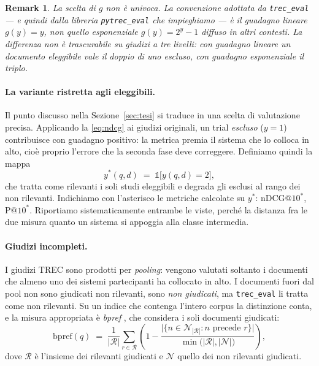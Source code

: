 \documentclass[pdflatex,sn-mathphys-num]{sn-jnl}
\theoremstyle{thmstyleone}
\theoremstyle{thmstyletwo}
\newtheorem{remark}{Remark}
\theoremstyle{thmstylethree}
\begin{document}
\begin{remark}
La scelta di $g$ non è univoca. La convenzione adottata da \texttt{trec\_eval} --- e quindi dalla libreria \texttt{pytrec\_eval} \cite{vangysel2018pytreceval} che impieghiamo --- è il guadagno \emph{lineare} $g(y) = y$, non quello esponenziale $g(y) = 2^{y}-1$ diffuso in altri contesti. La differenza non è trascurabile su giudizi a tre livelli: con guadagno lineare un documento eleggibile vale il doppio di uno escluso, con guadagno esponenziale il triplo.
\end{remark}

\paragraph{La variante ristretta agli eleggibili.} Il punto discusso nella Sezione~\ref{sec:tesi} si traduce in una scelta di valutazione precisa. Applicando la \eqref{eq:ndcg} ai giudizi originali, un trial \emph{escluso} ($y=1$) contribuisce con guadagno positivo: la metrica premia il sistema che lo colloca in alto, cioè proprio l'errore che la seconda fase deve correggere. Definiamo quindi la mappa
\begin{equation}
  y^{*}(q,d) \;=\; \mathds{1}\big[y(q,d) = 2\big],
  \label{eq:binaria}
\end{equation}
che tratta come rilevanti i soli studi eleggibili e degrada gli esclusi al rango dei non rilevanti. Indichiamo con l'asterisco le metriche calcolate su $y^{*}$: $\mathrm{nDCG@}10^{*}$, $\mathrm{P@}10^{*}$. Riportiamo sistematicamente entrambe le viste, perché la distanza fra le due misura quanto un sistema si appoggia alla classe intermedia.

\paragraph{Giudizi incompleti.} I giudizi TREC sono prodotti per \emph{pooling}: vengono valutati soltanto i documenti che almeno uno dei sistemi partecipanti ha collocato in alto. I documenti fuori dal pool non sono giudicati non rilevanti, sono \emph{non giudicati}, ma \texttt{trec\_eval} li tratta come non rilevanti. Su un indice che contenga l'intero corpus la distinzione conta, e la misura appropriata è \emph{bpref} \cite{buckley2004bpref}, che considera i soli documenti giudicati:
\begin{equation}
  \mathrm{bpref}(q) \;=\; \frac{1}{|\mathcal{R}|}\sum_{r \in \mathcal{R}} \left(1 - \frac{\big|\{n \in \mathcal{N}_{|\mathcal{R}|} : n \text{ precede } r\}\big|}{\min\big(|\mathcal{R}|, |\mathcal{N}|\big)}\right),
  \label{eq:bpref}
\end{equation}
dove $\mathcal{R}$ è l'insieme dei rilevanti giudicati e $\mathcal{N}$ quello dei non rilevanti giudicati.
\end{document}
